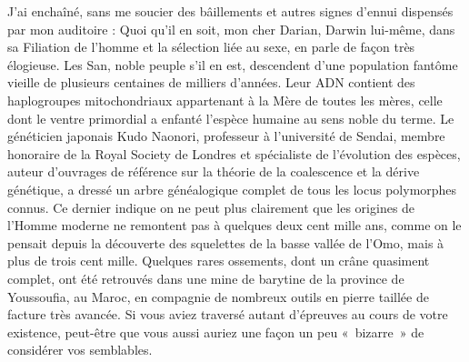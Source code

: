 \begin{dialogue}

J’ai enchaîné, sans me soucier des bâillements et autres signes d’ennui dispensés par mon auditoire : Quoi qu’il en soit, mon cher Darian, Darwin lui-même, dans sa Filiation de l’homme et la sélection liée au sexe, en parle de façon très élogieuse. Les San, noble peuple s’il en est, descendent d’une population fantôme vieille de plusieurs centaines de milliers d’années. Leur ADN contient des haplogroupes mitochondriaux appartenant à la Mère de toutes les mères, celle dont le ventre primordial a enfanté l’espèce humaine au sens noble du terme. Le généticien japonais Kudo Naonori, professeur à l’université de Sendai, membre honoraire de la Royal Society de Londres et spécialiste de l’évolution des espèces, auteur d’ouvrages de référence sur la théorie de la coalescence et la dérive génétique, a dressé un arbre généalogique complet de tous les locus polymorphes connus. Ce dernier indique on ne peut plus clairement que les origines de l’Homme moderne ne remontent pas à quelques deux cent mille ans, comme on le pensait depuis la découverte des squelettes de la basse vallée de l’Omo, mais à plus de trois cent mille. Quelques rares ossements, dont un crâne quasiment complet, ont été retrouvés dans une mine de barytine de la province de Youssoufia, au Maroc, en compagnie de nombreux outils en pierre taillée de facture très avancée. Si vous aviez traversé autant d’épreuves au cours de votre existence, peut-être que vous aussi auriez une façon un peu «~bizarre~» de considérer vos semblables.


\end{dialogue}
